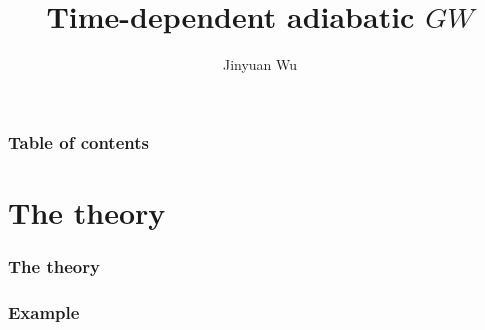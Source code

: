 \documentclass{beamer}
\title{Time-dependent adiabatic $GW$}
\author{Jinyuan Wu}
\begin{document}
\maketitle

\frame{\titlepage}

\begin{frame}
\frametitle{Table of contents}

\tableofcontents

\end{frame}

\section{The theory}

\begin{frame}
\frametitle{The theory}

 

\end{frame}

\begin{frame}
\frametitle{Example}

    

\end{frame}
\end{document}

